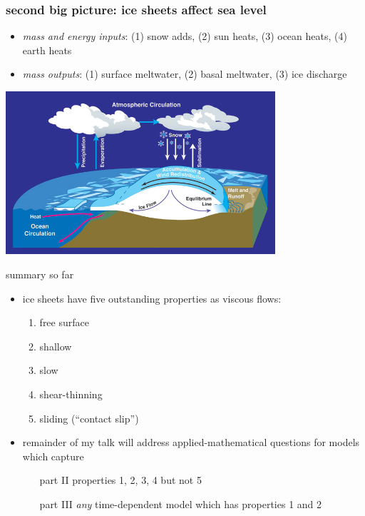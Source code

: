 \documentclass[hide notes,intlimits]{beamer}
\begin{document}
\begin{frame}
  \frametitle{second big picture: ice sheets affect sea level}
\medskip
\small
\begin{itemize}
\item \emph{mass and energy inputs}: (1) snow adds, (2) sun heats, (3) ocean heats, (4) earth heats
\item \emph{mass outputs}: (1) surface meltwater, (2) basal meltwater, (3) ice discharge
\end{itemize}
\begin{center}
  \includegraphics[width=0.75\textwidth]{mass-bal-atmos}
\end{center}
\end{frame}


\begin{frame}{summary so far}
\begin{itemize}
\item ice sheets have five outstanding properties as viscous flows:
  \begin{enumerate}
  \item \alert{free surface}
  \item \alert{shallow}
  \item \alert{slow}
  \item \alert{shear-thinning}
  \item \alert{sliding (``contact slip'')}
  \end{enumerate}
\item remainder of my talk will address applied-mathematical questions for models which capture
  \begin{itemize}
  \item[part II] properties 1, 2, 3, 4 but not 5
  \item[part III] \emph{any} time-dependent model which has properties 1 and 2
  \end{itemize}
\end{itemize}
\end{frame}
\end{document}
